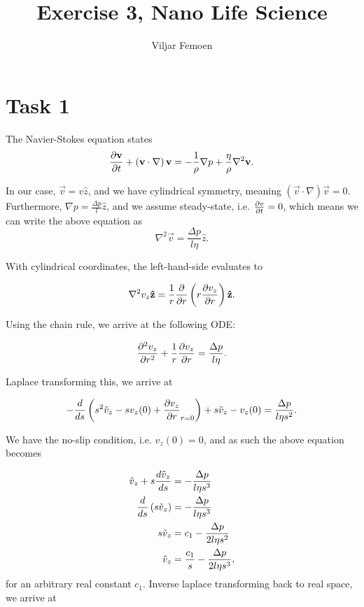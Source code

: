 

\title{Exercise 3, Nano Life Science}
\author{Viljar Femoen}



\maketitle
\section*{Task 1}

The Navier-Stokes equation states 
\begin{equation*}
    \pde{\vec{v}}{t} + \left(\vec{v} \cdot \nabla\right)\vec{v} = - \frac{1}{\rho}\nabla p + \frac{\eta}{\rho}\nabla^2\vec{v}.
\end{equation*}

In our case, $\vec{v} = v\hat{z}$, and we have cylindrical symmetry, meaning $\left(\vec{v} \cdot \nabla\right)\vec{v} =  0.$
Furthermore, $\nabla p = \frac{\Delta p}{l}\hat{z}$, and we assume steady-state, i.e. $\pde{v}{t} = 0$, which means we can write the above equation as
\begin{equation*}
    \nabla^2\vec{v} = \frac{\Delta p}{l\eta}\hat{z}.
\end{equation*}

With cylindrical coordinates, the left-hand-side evaluates to

\begin{equation*}
    \nabla^2 v_z\hat{z} = \frac{1}{r}\pde{}{r}\left(r\pde{v_z}{r}\right)\hat{z}. 
\end{equation*}

Using the chain rule, we arrive at the following ODE:

\begin{equation*}
    \pde[2]{v_z}{r} + \frac{1}{r}\pde{v_z}{r} = \frac{\Delta p}{l\eta}.
\end{equation*}

Laplace transforming this, we arrive at 

\begin{equation*}
    -\frac{d}{ds}\left(s^2\tilde{v}_z - sv_z(0) + \pde{v_z}{r}_{r = 0}\right) + s\tilde{v}_z - v_z(0) = \frac{\Delta p}{l\eta s^2}.
\end{equation*}

We have the no-slip condition, i.e. $v_z(0) = 0$, and as such the above equation becomes

\begin{align*}
    \tilde{v}_z + s\ode{\tilde{v}_z}{s} &= -\frac{\Delta p}{l\eta s^3} \\
    \ode{}{s}\left(s\tilde{v}_z\right) &= -\frac{\Delta p}{l\eta s^3} \\
    s\tilde{v}_z &= c_1 - \frac{\Delta p}{2l\eta s^2} \\
    \tilde{v}_z &= \frac{c_1}{s} - \frac{\Delta p}{2l\eta s^3},
\end{align*}
for an arbitrary real constant $c_1$. Inverse laplace transforming back to real space, we arrive at

